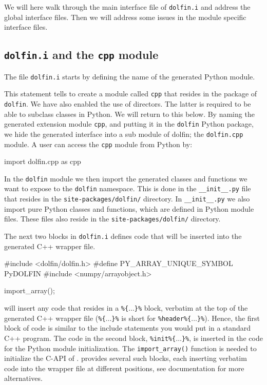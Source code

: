 \begin{code}
We will here walk through the main interface file of \texttt{dolfin.i} and address the global interface files. Then we will address some issues in the module specific interface files.\par

\subsection{\texttt{dolfin.i} and the \texttt{cpp} module}
The file \texttt{dolfin.i} starts by defining the name of the generated Python module.
\begin{code}
\end{code}
This statement tells \swig to create a module called \texttt{cpp} that resides in the package of \texttt{dolfin}. We have also enabled the use of directors. The latter is required to be able to subclass \dolfin classes in Python. We will return to this below. By naming the generated extension module \texttt{cpp}, and putting it in the \texttt{dolfin} Python package, we hide the generated interface into a sub module of dolfin; the \texttt{dolfin.cpp} module. A user can access the \texttt{cpp} module from Python by:
\begin{code}
import dolfin.cpp as cpp
\end{code}
In the \texttt{dolfin} module we then import the generated classes and functions we want to expose to the \texttt{dolfin} namespace. This is done in the \texttt{\_\_init\_\_.py} file that resides in the \texttt{site-packages/dolfin/} directory. In \texttt{\_\_init\_\_.py} we also import pure Python classes and functions, which are defined in Python module files. These files also reside in the \texttt{site-packages/dolfin/} directory.\par

The next two blocks in \texttt{dolfin.i} defines code that will be inserted into the \swig generated C++ wrapper file.
\begin{code}
#include <dolfin/dolfin.h>
#define PY_ARRAY_UNIQUE_SYMBOL PyDOLFIN
#include <numpy/arrayobject.h>

import_array();
\end{code}
\swig will insert any code that resides in a \texttt{\%\{$\ldots$\}\%} block, verbatim at the top of the generated C++ wrapper file (\texttt{\%\{$\ldots$\}\%} is short for \texttt{\%header\%\{$\ldots$\}\%}).
Hence, the first block of code is similar to the include statements you would put in a standard C++ program.
The code in the second block, \texttt{\%init\%\{$\ldots$\}\%}, is inserted in the code for the Python module initialization. The \texttt{import\_array()} function is needed to initialize the C-API of \numpy. \swig provides several such blocks, each inserting verbatim code into the wrapper file at different positions, see \swig documentation for more alternatives\cite{SWIG}.\par


\end{code}
